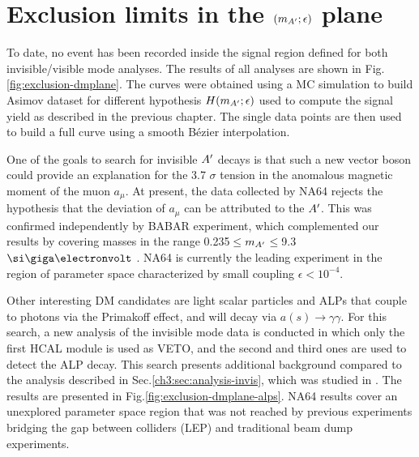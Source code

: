 
\section{Exclusion limits in the $(m_{A'};\epsilon)$ plane}
\label{ch4:sec:exclusion-limits}

To date, no event has been recorded inside the signal region defined for both invisible/visible mode analyses. The results of all analyses are shown in Fig.\ref{fig:exclusion-dmplane}. The curves were obtained using a MC simulation to build Asimov dataset for different hypothesis $H(m_{A'};\epsilon)$ used to compute the signal yield as described in the previous chapter. The single data points are then used to build a full curve using a smooth Bézier interpolation.

One of the goals to search for invisible $A'$ decays is that such a new vector boson could provide an explanation for the 3.7 $\sigma$ tension in the anomalous magnetic moment of the muon $a_{\mu}$. At present, the data collected by NA64 rejects the hypothesis that the deviation of $a_{\mu}$ can be attributed to the $A'$. This was confirmed independently by BABAR experiment, which complemented our results by covering masses in the range 0.235$\leq$$m_{A'}$$\leq$9.3 $\gev$ \cite{PhysRevLett.119.131804}. NA64 is currently the leading experiment in the region of parameter space characterized by small coupling $\epsilon < 10^{-4}$.

Other interesting DM candidates are light scalar particles and ALPs that couple to photons via the Primakoff effect, and will decay via $a(s) \to \gamma \gamma$. For this search, a new analysis of the invisible mode data is conducted in which only the first HCAL module is used as VETO, and the second and third ones are used to detect the ALP decay. This search presents additional background compared to the analysis described in Sec.\ref{ch3:sec:analysis-invis}, which was studied in \cite{Banerjee:2020fue}. The results are presented in Fig.\ref{fig:exclusion-dmplane-alps}. NA64 results cover an unexplored parameter space region that was not reached by previous experiments bridging the gap between colliders (LEP) and traditional beam dump experiments.

